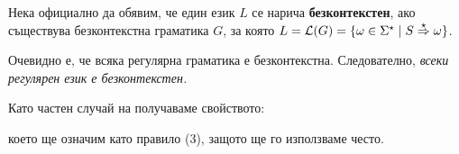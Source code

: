 
Нека официално да обявим, че един език $L$ се нарича {\bf безконтекстен}, ако съществува безконтекстна граматика $G$, за която 
$L = \L(G) = \{\omega \in \Sigma^\star \mid S \derive{\star} \omega\}$.

\begin{important}
\begin{remark}
  Очевидно е, че всяка регулярна граматика е безконтекстна. Следователно, 
  {\em всеки регулярен език е безконтекстен.}
\end{remark}
\end{important}

\begin{remark}
  Като частен случай на  получаваме свойството:
  \begin{prooftree}
  \end{prooftree}
  което ще означим като правило (3), защото ще го използваме често.
\end{remark}

